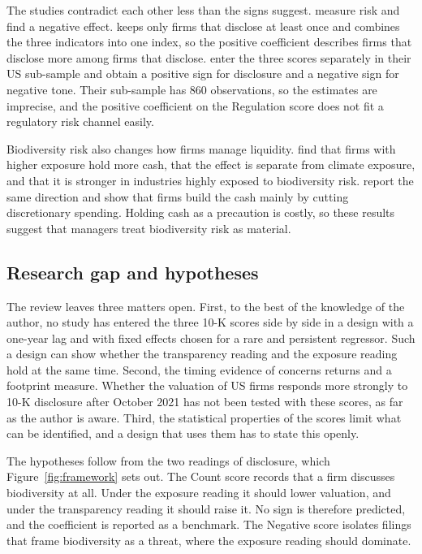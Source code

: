 \documentclass[12pt,a4paper]{article}
\begin{document}
The studies contradict each other less than the signs suggest. \citet{bach2025} measure risk and find a negative effect. \citet{he2024} keeps only firms that disclose at least once and combines the three indicators into one index, so the positive coefficient describes firms that disclose more among firms that disclose. \citet{cosma2025} enter the three scores separately in their US sub-sample and obtain a positive sign for disclosure and a negative sign for negative tone. Their sub-sample has 860 observations, so the estimates are imprecise, and the positive coefficient on the Regulation score does not fit a regulatory risk channel easily.

Biodiversity risk also changes how firms manage liquidity. \citet{ahmad2024} find that firms with higher exposure hold more cash, that the effect is separate from climate exposure, and that it is stronger in industries highly exposed to biodiversity risk. \citet{wang2026} report the same direction and show that firms build the cash mainly by cutting discretionary spending. Holding cash as a precaution is costly, so these results suggest that managers treat biodiversity risk as material.

\subsection{Research gap and hypotheses}

The review leaves three matters open. First, to the best of the knowledge of the author, no study has entered the three 10-K scores side by side in a design with a one-year lag and with fixed effects chosen for a rare and persistent regressor. Such a design can show whether the transparency reading and the exposure reading hold at the same time. Second, the timing evidence of \citet{garel2024} concerns returns and a footprint measure. Whether the valuation of US firms responds more strongly to 10-K disclosure after October 2021 has not been tested with these scores, as far as the author is aware. Third, the statistical properties of the scores limit what can be identified, and a design that uses them has to state this openly.

The hypotheses follow from the two readings of disclosure, which Figure~\ref{fig:framework} sets out. The Count score records that a firm discusses biodiversity at all. Under the exposure reading it should lower valuation, and under the transparency reading it should raise it. No sign is therefore predicted, and the coefficient is reported as a benchmark. The Negative score isolates filings that frame biodiversity as a threat, where the exposure reading should dominate.
\end{document}

